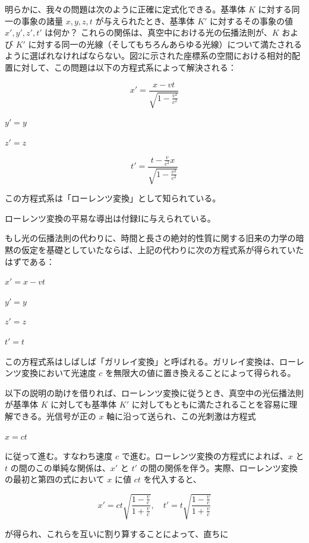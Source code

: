 \documentclass[a4paper,11pt,openany]{ltjsbook}
\begin{document}
明らかに、我々の問題は次のように正確に定式化できる。基準体 $K$ に対する同一の事象の諸量 $x, y, z, t$ が与えられたとき、基準体 $K'$ に対するその事象の値 $x', y', z', t'$ は何か？ これらの関係は、真空中における光の伝播法則が、$K$ および $K'$ に対する同一の光線（そしてもちろんあらゆる光線）について満たされるように選ばれなければならない。図2に示された座標系の空間における相対的配置に対して、この問題は以下の方程式系によって解決される：



\[ x' = \frac{x - vt}{\sqrt{1 - \frac{v^2}{c^2}}} \]



$y' = y$

$z' = z$



\[ t' = \frac{t - \frac{v}{c^2}x}{\sqrt{1 - \frac{v^2}{c^2}}} \]



この方程式系は「ローレンツ変換」として知られている。

 ローレンツ変換の平易な導出は付録Iに与えられている。

もし光の伝播法則の代わりに、時間と長さの絶対的性質に関する旧来の力学の暗黙の仮定を基礎としていたならば、上記の代わりに次の方程式系が得られていたはずである：

$x' = x - vt$

$y' = y$

$z' = z$

$t' = t$

この方程式系はしばしば「ガリレイ変換」と呼ばれる。ガリレイ変換は、ローレンツ変換において光速度 $c$ を無限大の値に置き換えることによって得られる。

以下の説明の助けを借りれば、ローレンツ変換に従うとき、真空中の光伝播法則が基準体 $K$ に対しても基準体 $K'$ に対してもともに満たされることを容易に理解できる。光信号が正の $x$ 軸に沿って送られ、この光刺激は方程式

$x = ct$

に従って進む。すなわち速度 $c$ で進む。ローレンツ変換の方程式によれば、$x$ と $t$ の間のこの単純な関係は、$x'$ と $t'$ の間の関係を伴う。実際、ローレンツ変換の最初と第四の式において $x$ に値 $ct$ を代入すると、



\[ x' = ct \sqrt{\frac{1 - \frac{v}{c}}{1 + \frac{v}{c}}}, \quad t' = t \sqrt{\frac{1 - \frac{v}{c}}{1 + \frac{v}{c}}} \]



が得られ、これらを互いに割り算することによって、直ちに
\end{document}
